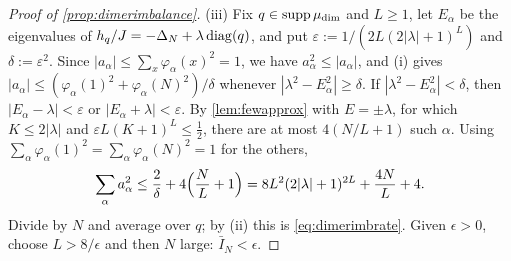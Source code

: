 \begin{proof}[Proof of \cref{prop:dimerimbalance}]
(iii) Fix $q\in\operatorname{supp}\mu_{\mathrm{dim}}$ and $L\ge1$, let $E_\alpha$ be the eigenvalues of $h_{q}/J=-\Delta_N+\lambda\operatorname{diag}(q)$, and put
$\varepsilon:=1/(2L(2|\lambda|+1)^L)$ and $\delta:=\varepsilon^2$.  Since $|a_\alpha|\le\sum_x\varphi_\alpha(x)^2=1$, we have
$a_\alpha^2\le|a_\alpha|$, and (i) gives $|a_\alpha|\le(\varphi_\alpha(1)^2+\varphi_\alpha(N)^2)/\delta$ whenever
$|\lambda^2-E_\alpha^2|\ge\delta$.  If $|\lambda^2-E_\alpha^2|<\delta$, then $|E_\alpha-\lambda|<\varepsilon$ or
$|E_\alpha+\lambda|<\varepsilon$.  By \cref{lem:fewapprox} with $E=\pm\lambda$, for which $K\le2|\lambda|$ and
$\varepsilon L(K+1)^L\le\frac12$, there are at most $4(N/L+1)$ such $\alpha$.  Using
$\sum_\alpha\varphi_\alpha(1)^2=\sum_\alpha\varphi_\alpha(N)^2=1$ for the others,
\[
  \sum_\alpha a_\alpha^2\le\frac2\delta+4\Bigl(\frac NL+1\Bigr)=8L^2(2|\lambda|+1)^{2L}+\frac{4N}L+4 .
\]
Divide by $N$ and average over $q$; by (ii) this is \eqref{eq:dimerimbrate}.  Given $\epsilon>0$, choose
$L>8/\epsilon$ and then $N$ large: $\bar I_N<\epsilon$.
\end{proof}

